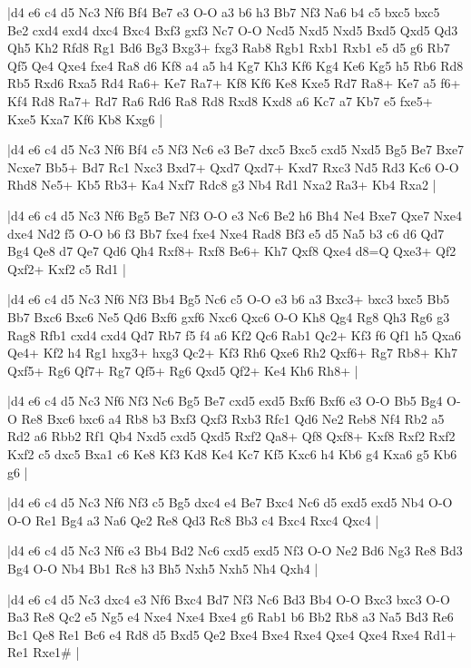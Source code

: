 \whitename{}
\blackname{}
\makegametitle
|d4 e6 c4 d5 Nc3 Nf6 Bf4 Be7 e3 O-O a3 b6 h3 Bb7 Nf3 Na6 b4 c5 bxc5 bxc5 Be2 cxd4 exd4 dxc4 Bxc4 Bxf3 gxf3 Nc7 O-O Ncd5 Nxd5 Nxd5 Bxd5 Qxd5 Qd3 Qh5 Kh2 Rfd8 Rg1 Bd6 Bg3 Bxg3+ fxg3 Rab8 Rgb1 Rxb1 Rxb1 e5 d5 g6 Rb7 Qf5 Qe4 Qxe4 fxe4 Ra8 d6 Kf8 a4 a5 h4 Kg7 Kh3 Kf6 Kg4 Ke6 Kg5 h5 Rb6 Rd8 Rb5 Rxd6 Rxa5 Rd4 Ra6+ Ke7 Ra7+ Kf8 Kf6 Ke8 Kxe5 Rd7 Ra8+ Ke7 a5 f6+ Kf4 Rd8 Ra7+ Rd7 Ra6 Rd6 Ra8 Rd8 Rxd8 Kxd8 a6 Kc7 a7 Kb7 e5 fxe5+ Kxe5 Kxa7 Kf6 Kb8 Kxg6  |

\whitename{}
\blackname{}
\makegametitle
|d4 e6 c4 d5 Nc3 Nf6 Bf4 c5 Nf3 Nc6 e3 Be7 dxc5 Bxc5 cxd5 Nxd5 Bg5 Be7 Bxe7 Ncxe7 Bb5+ Bd7 Rc1 Nxc3 Bxd7+ Qxd7 Qxd7+ Kxd7 Rxc3 Nd5 Rd3 Kc6 O-O Rhd8 Ne5+ Kb5 Rb3+ Ka4 Nxf7 Rdc8 g3 Nb4 Rd1 Nxa2 Ra3+ Kb4 Rxa2  |

\whitename{}
\blackname{}
\makegametitle
|d4 e6 c4 d5 Nc3 Nf6 Bg5 Be7 Nf3 O-O e3 Nc6 Be2 h6 Bh4 Ne4 Bxe7 Qxe7 Nxe4 dxe4 Nd2 f5 O-O b6 f3 Bb7 fxe4 fxe4 Nxe4 Rad8 Bf3 e5 d5 Na5 b3 c6 d6 Qd7 Bg4 Qe8 d7 Qe7 Qd6 Qh4 Rxf8+ Rxf8 Be6+ Kh7 Qxf8 Qxe4 d8=Q Qxe3+ Qf2 Qxf2+ Kxf2 c5 Rd1  |

\whitename{}
\blackname{}
\makegametitle
|d4 e6 c4 d5 Nc3 Nf6 Nf3 Bb4 Bg5 Nc6 c5 O-O e3 b6 a3 Bxc3+ bxc3 bxc5 Bb5 Bb7 Bxc6 Bxc6 Ne5 Qd6 Bxf6 gxf6 Nxc6 Qxc6 O-O Kh8 Qg4 Rg8 Qh3 Rg6 g3 Rag8 Rfb1 cxd4 cxd4 Qd7 Rb7 f5 f4 a6 Kf2 Qc6 Rab1 Qc2+ Kf3 f6 Qf1 h5 Qxa6 Qe4+ Kf2 h4 Rg1 hxg3+ hxg3 Qc2+ Kf3 Rh6 Qxe6 Rh2 Qxf6+ Rg7 Rb8+ Kh7 Qxf5+ Rg6 Qf7+ Rg7 Qf5+ Rg6 Qxd5 Qf2+ Ke4 Kh6 Rh8+  |

\whitename{}
\blackname{}
\makegametitle
|d4 e6 c4 d5 Nc3 Nf6 Nf3 Nc6 Bg5 Be7 cxd5 exd5 Bxf6 Bxf6 e3 O-O Bb5 Bg4 O-O Re8 Bxc6 bxc6 a4 Rb8 b3 Bxf3 Qxf3 Rxb3 Rfc1 Qd6 Ne2 Reb8 Nf4 Rb2 a5 Rd2 a6 Rbb2 Rf1 Qb4 Nxd5 cxd5 Qxd5 Rxf2 Qa8+ Qf8 Qxf8+ Kxf8 Rxf2 Rxf2 Kxf2 c5 dxc5 Bxa1 c6 Ke8 Kf3 Kd8 Ke4 Kc7 Kf5 Kxc6 h4 Kb6 g4 Kxa6 g5 Kb6 g6  |

\whitename{}
\blackname{}
\makegametitle
|d4 e6 c4 d5 Nc3 Nf6 Nf3 c5 Bg5 dxc4 e4 Be7 Bxc4 Nc6 d5 exd5 exd5 Nb4 O-O O-O Re1 Bg4 a3 Na6 Qe2 Re8 Qd3 Rc8 Bb3 c4 Bxc4 Rxc4 Qxc4  |

\whitename{}
\blackname{}
\makegametitle
|d4 e6 c4 d5 Nc3 Nf6 e3 Bb4 Bd2 Nc6 cxd5 exd5 Nf3 O-O Ne2 Bd6 Ng3 Re8 Bd3 Bg4 O-O Nb4 Bb1 Rc8 h3 Bh5 Nxh5 Nxh5 Nh4 Qxh4  |

\whitename{}
\blackname{}
\makegametitle
|d4 e6 c4 d5 Nc3 dxc4 e3 Nf6 Bxc4 Bd7 Nf3 Nc6 Bd3 Bb4 O-O Bxc3 bxc3 O-O Ba3 Re8 Qc2 e5 Ng5 e4 Nxe4 Nxe4 Bxe4 g6 Rab1 b6 Bb2 Rb8 a3 Na5 Bd3 Re6 Bc1 Qe8 Re1 Bc6 e4 Rd8 d5 Bxd5 Qe2 Bxe4 Bxe4 Rxe4 Qxe4 Qxe4 Rxe4 Rd1+ Re1 Rxe1\#  |

